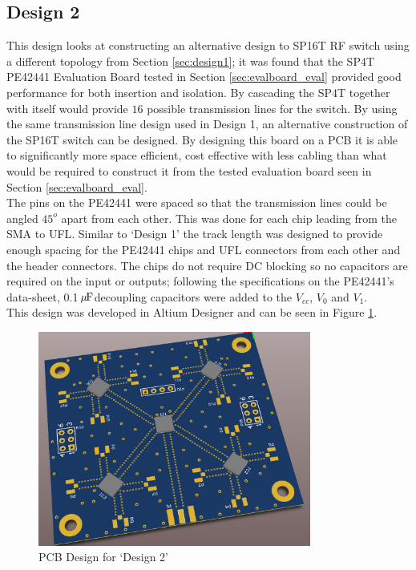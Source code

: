 \documentclass[12pt,openany,a4paper]{book}
\newcommand{\pack}	{\hspace{-0.08em}}
\newcommand{\uF}	{\ensuremath{\rm\,\mu\pack F}}
\begin{document}
\subsection{Design 2}		\label{sec:design2}
This design looks at constructing an alternative design to SP16T RF switch using a different topology from Section \ref{sec:design1}; it was found that the SP4T PE42441 Evaluation Board tested in Section \ref{sec:evalboard_eval} provided good performance for both insertion and isolation. By cascading the SP4T together with itself would provide $16$ possible transmission lines for the switch. By using the same transmission line design used in Design 1, an alternative construction of the SP16T switch can be designed. By designing this board on a PCB it is able to significantly more space efficient, cost effective with less cabling than what would be required to construct it from the tested evaluation board seen in Section \ref{sec:evalboard_eval}.\\[0.2cm]
The pins on the PE42441 were spaced so that the transmission lines could be angled $45^o$ apart from each other. This was done for each chip leading from the SMA to UFL. Similar to `Design 1' the track length was designed to provide enough spacing for the PE42441 chips and UFL connectors from each other and the header connectors. The chips do not require DC blocking so no capacitors are required on the input or outputs; following the specifications on the PE42441's data-sheet, 0.1\uF decoupling capacitors were added to the $V_{cc}$, $V_0$ and $V_1$. 
\\[0.2cm]
This design was developed in Altium Designer and can be seen in Figure \ref{fig:design2}.
\begin{figure}[H]
	\centering
    \includegraphics[width=0.8\textwidth]{design2_pcb.png}
	\caption{PCB Design for `Design 2'}
	\label{fig:design2}
\end{figure} 
\end{document}
